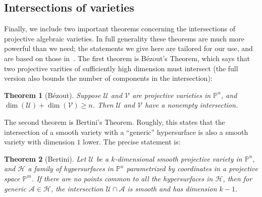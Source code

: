 \documentclass[aps,pra,notitlepage,preprintnumbers,11pt,tightenlines]{revtex4-1}
\renewcommand{\AA}{\mathcal{A}}
\newcommand{\HH}{\mathcal{H}}
\newcommand{\PP}{\mathbb{P}}
\newcommand{\UU}{\mathcal{U}}
\newcommand{\VV}{\mathcal{V}}
\newtheorem{theorem}{Theorem}
\begin{document}
\subsection{Intersections of varieties}\label{subsec:alggeo_intersection}
Finally, we include two important theorems concerning the intersections
of projective algebraic varieties. In full generality these theorems
are much more powerful than we need; the statements we give here are
tailored for our use, and are based on those in~\cite{nie:2009}. The first theorem is B\'{e}zout's Theorem, 
which says that two projective varities of sufficiently high dimension
must intersect (the full version also bounds the number of components
in the intersection):
\begin{theorem}[B\'{e}zout]
  Suppose $\UU$ and $\VV$ are projective varieties in $\PP^n$, and
  $\dim(\UU) + \dim(\VV) \geq n$. Then $\UU$ and $\VV$ have a nonempty
  intersection.
  \label{thm:bezout}
\end{theorem}
The second theorem is Bertini's Theorem. Roughly, this states that the intersection
of a smooth variety with a ``generic'' hypersurface is also a smooth
variety with dimension $1$ lower. The precise statement is:
\begin{theorem}[Bertini]
  Let $\UU$ be a $k$-dimensional smooth projective variety in $\PP^n$, and $\HH$ a
  family of hypersurfaces in $\PP^n$ parametrized by coordinates in a projective
  space $\PP^m$. If there are no points common to all the
  hypersurfaces in $\HH$, then for generic $\AA \in \HH$, the intersection
  $\UU \cap \AA$ is smooth and has dimension $k - 1$.
  \label{thm:bertini}
\end{theorem}
\end{document}
